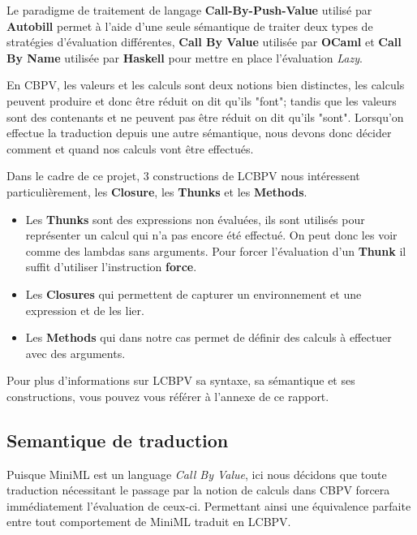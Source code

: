 \documentclass[12pt]{article}
\begin{document}
Le paradigme de traitement de langage \textbf{Call-By-Push-Value}
utilisé par \textbf{Autobill} permet à l'aide d'une seule sémantique de
traiter deux types de stratégies d'évaluation différentes, \textbf{Call
      By Value} utilisée par \textbf{OCaml} et \textbf{Call By Name} utilisée
par \textbf{Haskell} pour mettre en place l'évaluation \emph{Lazy}.

En CBPV, les valeurs et les calculs sont deux notions bien distinctes, les calculs peuvent produire et donc être réduit on dit qu'ils "font";
tandis que les valeurs sont des contenants et ne peuvent pas être réduit on dit qu'ils "sont".
Lorsqu'on effectue la traduction depuis une autre sémantique, nous devons donc décider comment et quand nos calculs vont être effectués.

Dans le cadre de ce projet, 3 constructions de LCBPV nous intéressent particulièrement, les \textbf{Closure}, les \textbf{Thunks} et les \textbf{Methods}.
\begin{itemize}
      \item
            Les \textbf{Thunks} sont des expressions non évaluées, ils sont utilisés pour représenter un calcul qui n'a pas encore été effectué.
            On peut donc les voir comme des lambdas sans arguments.
            Pour forcer l'évaluation d'un \textbf{Thunk} il suffit d'utiliser l'instruction  \textbf{force}.
      \item
            Les \textbf{Closures} qui permettent de capturer un environnement et une expression et de les lier.
      \item
            Les \textbf{Methods} qui dans notre cas permet de définir des calculs à effectuer avec des arguments.
\end{itemize}
Pour plus d'informations sur LCBPV sa syntaxe, sa sémantique et ses constructions, vous pouvez vous référer à l'annexe de ce rapport.

\hypertarget{semantique-de-traduction}{%
      \subsection{Semantique de traduction}\label{semantique-de-traduction}}

Puisque MiniML est un language \emph{Call By Value}, ici nous décidons que toute traduction nécessitant le passage par la notion de calculs dans CBPV forcera immédiatement l'évaluation de ceux-ci.
Permettant ainsi une équivalence parfaite entre tout comportement de MiniML traduit en LCBPV.
\end{document}
